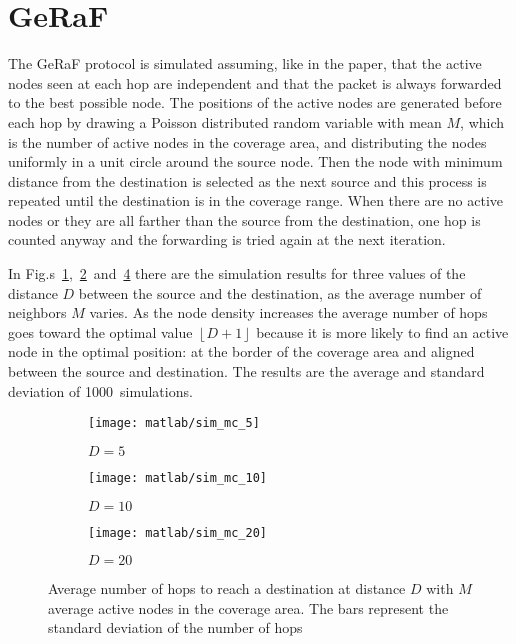 \documentclass[a4paper,oneside]{article}
\newcommand{\floor}[1]{\left\lfloor#1\right\rfloor}
\begin{document}
\section{GeRaF}
The GeRaF protocol is simulated assuming, like in the paper, that the
active nodes seen at each hop are independent and that the packet is
always forwarded to the best possible node.
%
The positions of the active nodes are generated before each hop by
drawing a Poisson distributed random variable with mean $M$, which is
the number of active nodes in the coverage area, and distributing the
nodes uniformly in a unit circle around the source node.
%
Then the node with minimum distance from the destination is selected
as the next source and this process is repeated until the destination
is in the coverage range.
%
When there are no active nodes or they are all farther than the source
from the destination, one hop is counted anyway and the forwarding is
tried again at the next iteration.

In
Fig.s~\ref{plot:geraf_sim_5},~\ref{plot:geraf_sim_10}~and~\ref{plot:geraf_sim_20}
there are the simulation results for three values of the distance $D$
between the source and the destination, as the average number of
neighbors $M$ varies. As the node density increases the average number
of hops goes toward the optimal value $\floor{D+1}$ because it is more
likely to find an active node in the optimal position: at the border
of the coverage area and aligned between the source and destination.
%
The results are the average and standard deviation of
1000~simulations.
\begin{figure}[htbp]
  \centering
  \begin{subfigure}{0.5\textwidth}
    \centering
    \texttt{[image: matlab/sim\_mc\_5]}
    \caption{$ D = 5 $}
    \label{plot:geraf_sim_5}
  \end{subfigure}%
  \begin{subfigure}{0.5\textwidth}
    \centering
    \texttt{[image: matlab/sim\_mc\_10]}
    \caption{$ D = 10 $}
    \label{plot:geraf_sim_10}
  \end{subfigure}
  \begin{subfigure}{0.5\textwidth}
    \centering
    \texttt{[image: matlab/sim\_mc\_20]}
    \caption{$ D = 20 $}
    \label{plot:geraf_sim_20}
  \end{subfigure}
  \caption{Average number of hops to reach a destination at distance
    $D$ with $M$ average active nodes in the coverage area. The bars
    represent the standard deviation of the number of hops}
\end{figure}
\end{document}
